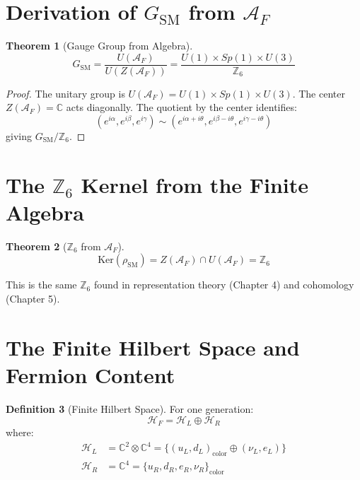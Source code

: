 \documentclass[11pt,a4paper,openright]{book}
\theoremstyle{plain}
\newtheorem{theorem}{Theorem}[chapter]
\theoremstyle{definition}
\newtheorem{definition}[theorem]{Definition}
\newcommand{\Hil}{\mathcal{H}}
\newcommand{\A}{\mathcal{A}}
\newcommand{\SM}{\mathrm{SM}}
\newcommand{\Ker}{\mathrm{Ker}}
\newcommand{\C}{\mathbb{C}}
\newcommand{\Z}{\mathbb{Z}}
\begin{document}
\section{Derivation of $G_{\SM}$ from $\A_F$}

\begin{theorem}[Gauge Group from Algebra]
\begin{equation}
G_{\SM} = \frac{U(\A_F)}{U(Z(\A_F))} = \frac{U(1) \times Sp(1) \times U(3)}{\Z_6}
\end{equation}
\end{theorem}

\begin{proof}
The unitary group is $U(\A_F) = U(1) \times Sp(1) \times U(3)$. The center $Z(\A_F) = \C$ acts diagonally. The quotient by the center identifies:
\begin{equation}
(e^{i\alpha}, e^{i\beta}, e^{i\gamma}) \sim (e^{i\alpha + i\theta}, e^{i\beta - i\theta}, e^{i\gamma - i\theta})
\end{equation}
giving $G_{\SM}/\Z_6$.
\end{proof}

\section{The $\Z_6$ Kernel from the Finite Algebra}

\begin{theorem}[$\Z_6$ from $\A_F$]
\begin{equation}
\Ker(\rho_{\SM}) = Z(\A_F) \cap U(\A_F) = \Z_6
\end{equation}
\end{theorem}

This is the same $\Z_6$ found in representation theory (Chapter 4) and cohomology (Chapter 5).

\section{The Finite Hilbert Space and Fermion Content}

\begin{definition}[Finite Hilbert Space]
For one generation:
\begin{equation}
\Hil_F = \Hil_L \oplus \Hil_R
\end{equation}
where:
\begin{align}
\Hil_L &= \C^2 \otimes \C^4 = \{(u_L, d_L)_{\text{color}} \oplus (\nu_L, e_L)\} \\
\Hil_R &= \C^4 = \{u_R, d_R, e_R, \nu_R\}_{\text{color}}
\end{align}
\end{definition}
\end{document}
